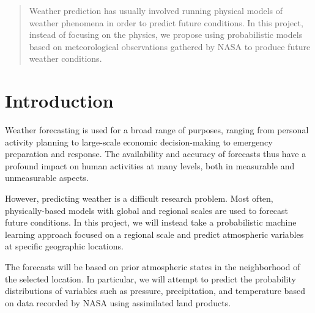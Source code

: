 \documentclass{article}
\begin{document}
 


\begin{abstract} 
Weather prediction has usually involved running physical models of weather phenomena in order to predict future conditions. In this project, instead of focusing on the physics, we propose using probabilistic models based on meteorological observations gathered by NASA to produce future weather conditions.
\end{abstract} 

\section{Introduction}
\label{submission}

Weather forecasting is used for a broad range of purposes, ranging from personal activity planning to large-scale economic decision-making to emergency preparation and response. The availability and accuracy of forecasts thus have a profound impact on human activities at many levels, both in measurable and unmeasurable aspects.

However, predicting weather is a difficult research problem. Most often, physically-based models with global and regional scales are used to forecast future conditions. In this project, we will instead take a probabilistic machine learning approach focused on a regional scale and predict atmospheric variables at specific geographic locations.

The forecasts will be based on prior atmospheric states in the neighborhood of the selected location. In particular, we will attempt to predict the probability distributions of variables such as pressure, precipitation, and temperature based on data recorded by NASA using assimilated land products.
\end{document}
